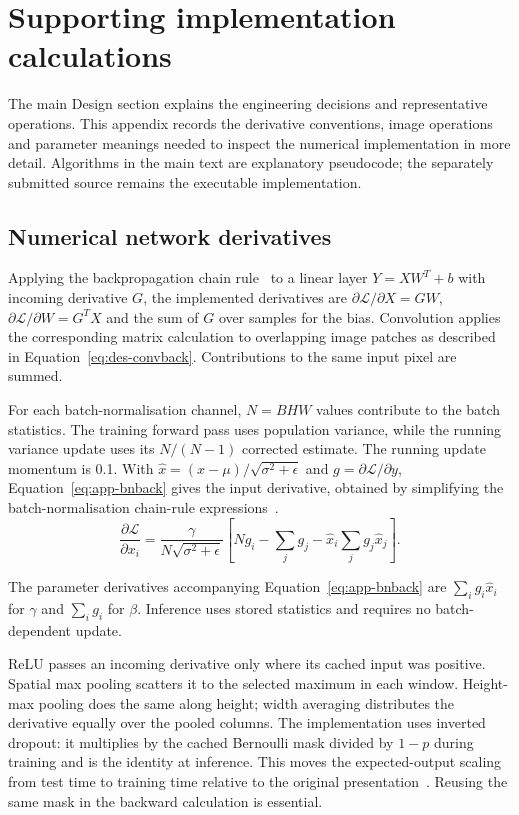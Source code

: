 
\section{Supporting implementation calculations}
\label{app:des-implementation}
The main Design section explains the engineering decisions and representative operations. This appendix records the derivative conventions, image operations and parameter meanings needed to inspect the numerical implementation in more detail. Algorithms in the main text are explanatory pseudocode; the separately submitted source remains the executable implementation.

\subsection{Numerical network derivatives}
\label{app:des-derivatives}
Applying the backpropagation chain rule~\cite[pp.~3--4]{lecun1998} to a linear layer $Y=XW^T+b$ with incoming derivative $G$, the implemented derivatives are $\partial\mathcal L/\partial X=GW$, $\partial\mathcal L/\partial W=G^TX$ and the sum of $G$ over samples for the bias. Convolution applies the corresponding matrix calculation to overlapping image patches as described in Equation~\ref{eq:des-convback}. Contributions to the same input pixel are summed.

For each batch-normalisation channel, $N=BHW$ values contribute to the batch statistics. The training forward pass uses population variance, while the running variance update uses its $N/(N-1)$ corrected estimate. The running update momentum is 0.1. With $\widehat x=(x-\mu)/\sqrt{\sigma^2+\epsilon}$ and $g=\partial\mathcal L/\partial y$, Equation~\ref{eq:app-bnback} gives the input derivative, obtained by simplifying the batch-normalisation chain-rule expressions~\cite[p.~4]{ioffe2015}.
\begin{equation}
\frac{\partial\mathcal L}{\partial x_i}=
\frac{\gamma}{N\sqrt{\sigma^2+\epsilon}}
\left[Ng_i-\sum_jg_j-\widehat x_i\sum_jg_j\widehat x_j\right].
\label{eq:app-bnback}
\end{equation}

The parameter derivatives accompanying Equation~\ref{eq:app-bnback} are $\sum_i g_i\widehat x_i$ for $\gamma$ and $\sum_i g_i$ for $\beta$. Inference uses stored statistics and requires no batch-dependent update.

ReLU passes an incoming derivative only where its cached input was positive. Spatial max pooling scatters it to the selected maximum in each window. Height-max pooling does the same along height; width averaging distributes the derivative equally over the pooled columns. The implementation uses inverted dropout: it multiplies by the cached Bernoulli mask divided by $1-p$ during training and is the identity at inference. This moves the expected-output scaling from test time to training time relative to the original presentation~\cite[pp.~1931, 1934]{srivastava2014}. Reusing the same mask in the backward calculation is essential.

